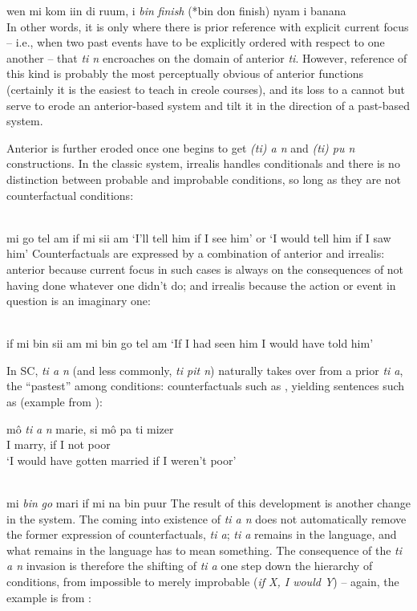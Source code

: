 \ea\label{ex:2:111}
 wen mi kom iin di ruum, i \textit{bin} \textit{finish }(*bin don finish) nyam i banana\\
\z
In other words, it is only where there is prior reference with explicit current focus  --  i.e., when two past events have to be explicitly ordered with respect to one another  --  that \textit{ti n} encroaches on the domain of anterior \textit{ti}. However, reference of this kind is probably the most perceptually obvious of anterior functions (certainly it is the easiest to teach in creole courses), and its loss to a  cannot but serve to erode an anterior-based system and tilt it in the direction of a past-based system.


Anterior is further eroded once one begins to get \textit{(ti) a n} and \textit{(ti) pu n} constructions. In the classic system, irrealis handles condi\-tionals and there is no distinction between probable and improbable conditions, so long as they are not counterfactual conditions:

\ea\label{ex:2:112}
\langinfo{\langGC}{}{}\\
mi go tel am if mi sii am
\glt `I'll tell him if I see him' or `I would tell him if I saw him'
\z
Counterfactuals are expressed by a combination of anterior and irrealis: anterior because current focus in such cases is always on the conse\-quences of not having done whatever one didn't do; and irrealis because the action or event in question is an imaginary one:

\ea\label{ex:2:113}
\langinfo{\langGC}{}{}\\
if mi bin sii am mi bin go tel am
\glt `If I had seen him I would have told him'
\z

In SC, \textit{ti a n} (and less commonly, \textit{ti pit n}) naturally takes over from a prior \textit{ti a}, the ``pastest'' among conditions: counterfactuals such as , yielding sentences such as  (example from \cite[109]{Corne1977}):

\ea\label{ex:2:114}
\gll mô \emph{ti} \emph{a} \emph{n} marie, si mô pa ti mizer\\
I {\TNS} {\MOD} {\COMP} marry, if I not {\TNS} poor\\
\glt `I would have gotten married if I weren't poor' 
\z

\ea\label{ex:2:115}
\langinfo{\langGC}{}{}\\
mi \textit{bin} \textit{go} mari if mi na bin puur
\z
The result of this development is another change in the system. The coming into existence of \textit{ti a n} does not automatically remove the former expression of counterfactuals, \textit{ti a}; \textit{ti a} remains in the lan\-guage, and what remains in the language has to mean something. The consequence of the \textit{ti a n} invasion is therefore the shifting of \textit{ti a} one step down the hierarchy of conditions, from impossible to merely improbable (\textit{if X, I would Y})  --  again, the example is from \citet[106]{Corne1977}:

